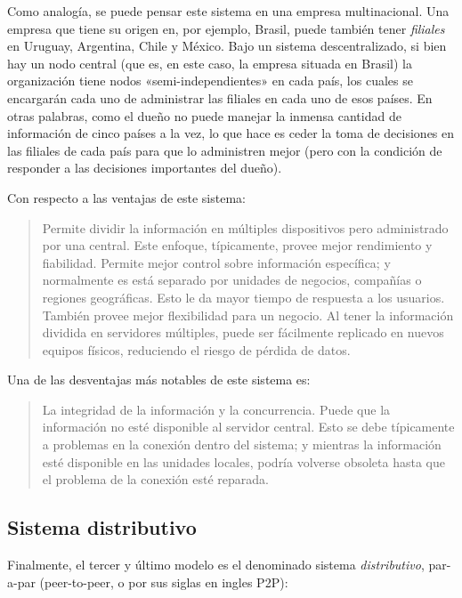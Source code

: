 \documentclass[12pt,a4paper,twoside]{book}
\begin{document}
Como analogía, se puede pensar este sistema en una empresa multinacional. Una empresa que tiene su origen en, por ejemplo, Brasil, puede también tener \textit{filiales} en Uruguay, Argentina, Chile y México. Bajo un sistema descentralizado, si bien hay un nodo central (que es, en este caso, la empresa situada en Brasil) la organización tiene nodos «semi-independientes» en cada país, los cuales se encargarán cada uno de administrar las filiales en cada uno de esos países. En otras palabras, como el dueño no puede manejar la inmensa cantidad de información de cinco países a la vez, lo que hace es ceder la toma de decisiones en las filiales de cada país para que lo administren mejor (pero con la condición de responder a las decisiones importantes del dueño).

Con respecto a las ventajas de este sistema:

\begin{quotation}
Permite dividir la información en múltiples dispositivos pero administrado por una central. Este enfoque, típicamente, provee mejor rendimiento y fiabilidad. Permite mejor control sobre información específica; y normalmente es está separado por unidades de negocios, compañías o regiones geográficas. Esto le da mayor tiempo de respuesta a los usuarios. También provee mejor flexibilidad para un negocio. Al tener la información dividida en servidores múltiples, puede ser fácilmente replicado en nuevos equipos físicos, reduciendo el riesgo de pérdida de datos. \cite{sist:descentral}
\end{quotation}

Una de las desventajas más notables de este sistema es:

\begin{quotation}
La integridad de la información y la concurrencia. Puede que la información no esté disponible al servidor central. Esto se debe típicamente a problemas en la conexión dentro del sistema; y mientras la información esté disponible en las unidades locales, podría volverse obsoleta hasta que el problema de la conexión esté reparada. \cite{sist:descentral}
\end{quotation}

\subsection{Sistema distributivo}
Finalmente, el tercer y último modelo es el denominado sistema \textit{distributivo}, par-a-par (peer-to-peer, o por sus siglas en ingles P2P):
\end{document}
